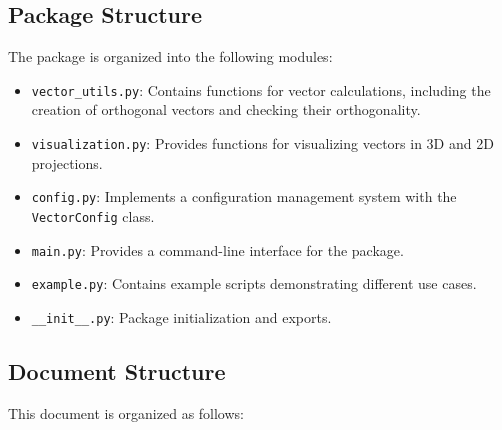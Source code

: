 \subsection{Package Structure}

The package is organized into the following modules:

\begin{itemize}
    \item \texttt{vector\_utils.py}: Contains functions for vector calculations, including the creation of orthogonal vectors and checking their orthogonality.
    
    \item \texttt{visualization.py}: Provides functions for visualizing vectors in 3D and 2D projections.
    
    \item \texttt{config.py}: Implements a configuration management system with the \texttt{VectorConfig} class.
    
    \item \texttt{main.py}: Provides a command-line interface for the package.
    
    \item \texttt{example.py}: Contains example scripts demonstrating different use cases.
    
    \item \texttt{\_\_init\_\_.py}: Package initialization and exports.
\end{itemize}

\subsection{Document Structure}

This document is organized as follows:

